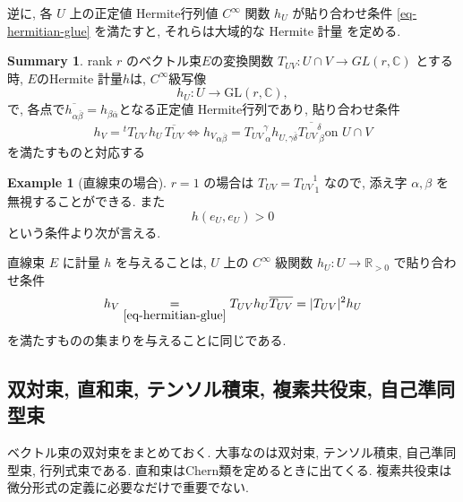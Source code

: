 \documentclass[dvipdfmx,a4paper,11pt]{article} %
\theoremstyle{definition}
\newtheorem{example}[thm]{Example}
\newtheorem{suma}[thm]{Summary}
\theoremstyle{remark}
\numberwithin{equation}{section}
\newcommand{\R}{\mathbb{R}}
\newcommand{\C}{\mathbb{C}}
\begin{document}
逆に, 各 \(U\) 上の正定値 Hermite行列値 \(C^\infty\) 関数 \(h_U\) が貼り合わせ条件 \eqref{eq-hermitian-glue} を満たすと, それらは大域的な Hermite 計量 を定める.

\begin{tcolorbox}[mybox]
\begin{suma}
 rank \(r\) のベクトル束$E$の変換関数 \(T_{UV} : U \cap V \to GL(r,\mathbb{C})\) とする時, $E$のHermite 計量$h$は, $C^\infty$級写像
 $$
 h_U: U \to \mathrm{GL}(r, \C),
 $$
 で, 各点で\(\overline{h_{\alpha\overline{\beta}}}=h_{\beta \overline{\alpha}}\)となる正定値 Hermite行列であり,  貼り合わせ条件
\begin{equation*}
h_V={}^{t}T_{UV}\,h_U\,\overline{T_{UV}}
\Leftrightarrow
{h_V}_{\alpha \overline{\beta}}
=
{T_{UV}}^{\gamma}_{\ \alpha} h_{U,\gamma\overline{\delta}}\overline{{T_{UV}}^{\delta}_{\ \beta}}
\text{on $U \cap V$}
\end{equation*}
を満たすものと対応する
\end{suma}
\end{tcolorbox}


\begin{example}[直線束の場合]
\(r=1\) の場合は
\(T_{UV}={T_{UV}}^{1}_{\ 1}\) なので, 添え字 \(\alpha,\beta\) を無視することができる.
また
\[
h(e_U, e_U) >0
\]
という条件より次が言える.
\begin{tcolorbox}[mybox]
直線束 \(E\) に計量 \(h\) を与えることは, \(U\) 上の \(C^{\infty}\) 級関数 \(h_U : U \to \R_{>0}\) で貼り合わせ条件
\[
h_V \underset{\eqref{eq-hermitian-glue}}{=}
 T_{UV}  h_U\overline{T_{UV}}
 =|T_{UV}|^2 h_U
\]
を満たすものの集まりを与えることに同じである.
\end{tcolorbox}
\end{example}



\subsection{双対束, 直和束, テンソル積束, 複素共役束, 自己準同型束}
ベクトル束の双対束をまとめておく. 
大事なのは双対束, テンソル積束, 自己準同型束, 行列式束である. 
直和束はChern類を定めるときに出てくる. 複素共役束は微分形式の定義に必要なだけで重要でない.
\end{document}
